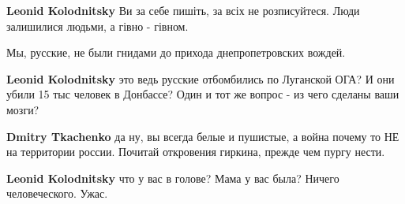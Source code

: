 \begin{itemize}
\begin{itemize}
 
\textbf{Leonid Kolodnitsky} Ви за себе пишіть, за всіх не розписуйтеся. Люди залишилися людьми, а гівно - гівном.

 
Мы, русские, не были гнидами до прихода днепропетровских вождей.

 
\textbf{Leonid Kolodnitsky} это ведь русские отбомбились по Луганской ОГА? И
они убили 15 тыс человек в Донбассе? Один и тот же вопрос - из чего сделаны
ваши мозги?

 
\textbf{Dmitry Tkachenko} да ну, вы всегда белые и пушистые, а война почему то
НЕ на территории россии. Почитай откровения гиркина, прежде чем пургу нести.

 
\textbf{Leonid Kolodnitsky} что у вас в голове? Мама у вас была? Ничего человеческого. Ужас.

 

\end{itemize}
\end{itemize}
